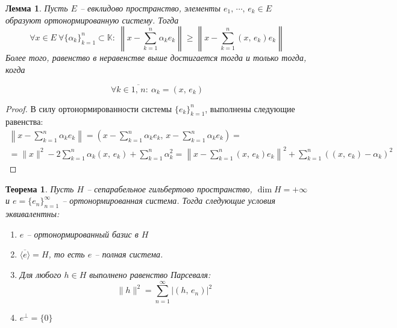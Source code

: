 \documentclass[a4paper,12pt]{article}
\renewcommand{\geq}{\ensuremath{\geqslant}}
\theoremstyle{plain}
\newtheorem{theorem}{Теорема}[section]
\newtheorem{lemma}{Лемма}[section]
\theoremstyle{definition}
\theoremstyle{remark}
\begin{document}
\begin{lemma}
	Пусть $E$ -- евклидово пространство, элементы $e_1,\,\cdots,\, e_k \in E$ образуют ортонормированную систему. Тогда
	\[
		\forall x \in E \: \forall \{\alpha_k\}_{k = 1}^n \subset \mathbb{K} :\: \left\|x - \sum_{k =1}^n\alpha_ke_k\right\| \geq \left\|x - \sum_{k = 1}^n(x,\,e_k)e_k\right\|
	\]
	Более того, равенство в неравенстве выше достигается тогда и только тогда, когда

	\[
		\forall k \in \overline{1,\, n} :\: \alpha_k = (x,\, e_k)
	\]
\end{lemma}

\begin{proof}
  В силу ортонормированности системы $\{e_k\}_{k = 1}^n$, выполнены следующие равенства:
  \begin{align*}
    \left\|x - \sum_{k=1}^n \alpha_ke_k\right\| = \left(x - \sum_{k = 1}^n\alpha_ke_k,\, x - \sum_{k = 1}^n \alpha_ke_k\right) = \\
    = \|x\|^2 - 2\sum_{k = 1}^n \alpha_k(x,\,e_k) + \sum_{k = 1}^n \alpha_k^2 = \left\|x - \sum_{k = 1}^n (x,\, e_k)e_k\right\|^2 + \sum_{k = 1}^n ((x,\, e_k) - \alpha_k)^2
  \end{align*}
\end{proof}

\begin{theorem}
	Пусть $H$ -- сепарабельное гильбертово пространство, $\dim H = +\infty$ и $e = \{e_n\}_{n=1}^\infty$ -- ортонормированная система. Тогда следующие условия эквивалентны:
	\begin{enumerate}
		\item $e$ -- ортонормированный базис в $H$
		\item $\overline{\langle e\rangle} = H$, то есть $e$ -- полная система.
		\item Для любого $h \in H$ выполнено равенство Парсеваля:
		      \[
			      \|h\|^2 = \sum_{n = 1}^\infty \vert (h,\, e_n)\vert^2
		      \]
		\item $e^\bot = \{0\}$
	\end{enumerate}
\end{theorem}
\end{document}

